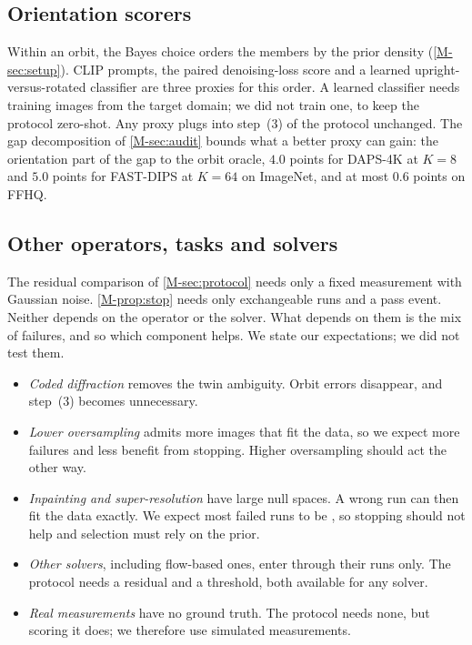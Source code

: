 \subsection{Orientation scorers}
\label{sec:suppl-orientation}
Within an orbit, the Bayes choice orders the members by the prior density (\cref{M-sec:setup}).
CLIP prompts, the paired denoising-loss score and a learned upright-versus-rotated classifier are three proxies for this order.
A learned classifier needs training images from the target domain; we did not train one, to keep the protocol zero-shot.
Any proxy plugs into step~(3) of the protocol unchanged.
The gap decomposition of \cref{M-sec:audit} bounds what a better proxy can gain: the orientation part of the gap to the orbit oracle, $4.0$ points for DAPS-4K at $K=8$ and $5.0$ points for FAST-DIPS at $K=64$ on ImageNet, and at most $0.6$ points on FFHQ.

\subsection{Other operators, tasks and solvers}
\label{sec:suppl-scope}
The residual comparison of \cref{M-sec:protocol} needs only a fixed measurement with Gaussian noise.
\cref{M-prop:stop} needs only exchangeable runs and a pass event.
Neither depends on the operator or the solver.
What depends on them is the mix of failures, and so which component helps.
We state our expectations; we did not test them.
\begin{itemize}[leftmargin=*,itemsep=1pt,topsep=2pt]
\item \emph{Coded diffraction} removes the twin ambiguity. Orbit errors disappear, and step~(3) becomes unnecessary.
\item \emph{Lower oversampling} admits more images that fit the data, so we expect more \cons failures and less benefit from stopping. Higher oversampling should act the other way.
\item \emph{Inpainting and super-resolution} have large null spaces. A wrong run can then fit the data exactly. We expect most failed runs to be \cons, so stopping should not help and selection must rely on the prior.
\item \emph{Other solvers}, including flow-based ones, enter through their runs only. The protocol needs a residual and a threshold, both available for any solver.
\item \emph{Real measurements} have no ground truth. The protocol needs none, but scoring it does; we therefore use simulated measurements.
\end{itemize}

